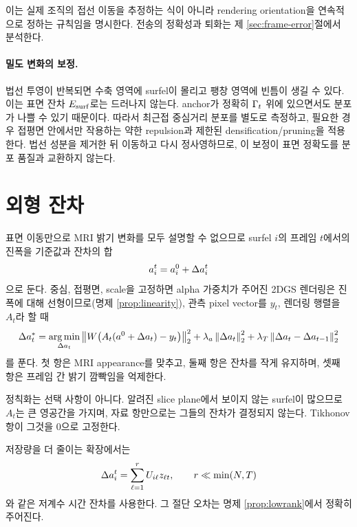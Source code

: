 이는 실제 조직의 접선 이동을 추정하는 식이 아니라 rendering orientation을
연속적으로 정하는 규칙임을 명시한다. 전송의 정확성과 퇴화는 제 \ref{sec:frame-error}절에서
분석한다.

\paragraph{밀도 변화의 보정.}
법선 투영이 반복되면 수축 영역에 surfel이 몰리고 팽창 영역에 빈틈이 생길 수 있다.
이는 표면 잔차 $E_{\mathrm{surf}}$로는 드러나지 않는다. anchor가 정확히 $\Gamma_t$ 위에 있으면서도
분포가 나쁠 수 있기 때문이다. 따라서 최근접 중심거리 분포를 별도로 측정하고, 필요한
경우 접평면 안에서만 작용하는 약한 repulsion과 제한된 densification/pruning을 적용한다.
법선 성분을 제거한 뒤 이동하고 다시 정사영하므로, 이 보정이 표면 정확도를 분포
품질과 교환하지 않는다.

\section{외형 잔차}
\label{sec:residual}

표면 이동만으로 MRI 밝기 변화를 모두 설명할 수 없으므로 surfel $i$의 프레임 $t$에서의
진폭을 기준값과 잔차의 합
\begin{equation}
  a^t_i = a^0_i + \Delta a^t_i
  \label{eq:amplitude-split}
\end{equation}
으로 둔다. 중심, 접평면, scale을 고정하면 alpha 가중치가 주어진 2DGS 렌더링은 진폭에
대해 선형이므로(명제 \ref{prop:linearity}), 관측 pixel vector를 $y_t$, 렌더링 행렬을
$A_t$라 할 때
\begin{equation}
  \Delta a^*_t = \operatorname*{arg\,min}_{\Delta a_t}
  \left\lVert W\bigl(A_t(a^0+\Delta a_t) - y_t\bigr) \right\rVert^2_2
  + \lambda_a \left\lVert \Delta a_t \right\rVert^2_2
  + \lambda_T \left\lVert \Delta a_t - \Delta a_{t-1} \right\rVert^2_2
  \label{eq:residual-ls}
\end{equation}
를 푼다. 첫 항은 MRI appearance를 맞추고, 둘째 항은 잔차를 작게 유지하며, 셋째 항은
프레임 간 밝기 깜빡임을 억제한다.

정칙화는 선택 사항이 아니다. 알려진 slice plane에서 보이지 않는 surfel이 많으므로
$A_t$는 큰 영공간을 가지며, 자료 항만으로는 그들의 잔차가 결정되지 않는다. Tikhonov
항이 그것을 0으로 고정한다.

저장량을 더 줄이는 확장에서는
\begin{equation}
  \Delta a^t_i = \sum_{\ell=1}^{r} U_{i\ell} z_{\ell t},
  \qquad r \ll \min(N,T)
  \label{eq:lowrank}
\end{equation}
와 같은 저계수 시간 잔차를 사용한다. 그 절단 오차는 명제 \ref{prop:lowrank}에서
정확히 주어진다.


